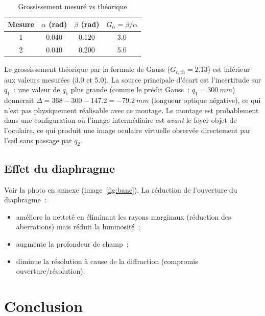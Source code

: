 ﻿\documentclass[a4paper, 11pt]{article}
\begin{document}
\begin{table}[H]
\centering
\caption{Grossissement mesuré vs théorique}
\begin{tabular}{cccc}
\toprule
Mesure & $\alpha$ (rad) & $\beta$ (rad) & $G_\alpha = \beta/\alpha$ \\
\midrule
1 & 0.040 & 0.120 & 3.0 \\
2 & 0.040 & 0.200 & 5.0 \\
\bottomrule
\end{tabular}
\end{table}

Le grossissement théorique par la formule de Gauss ($G_{c,\mathrm{th}} = 2.13$) est inférieur aux valeurs mesurées (3.0 et 5.0). La source principale d'écart est l'incertitude sur $q_1$~: une valeur de $q_1$ plus grande (comme le prédit Gauss~: $q_1 = \SI{300}{mm}$) donnerait $\Delta = 368 - 300 - 147.2 = \SI{-79.2}{mm}$ (longueur optique négative), ce qui n'est pas physiquement réalisable avec ce montage. Le montage est probablement dans une configuration où l'image intermédiaire est \emph{avant} le foyer objet de l'oculaire, ce qui produit une image oculaire virtuelle observée directement par l'œil sans passage par $q_2$.

\subsection{Effet du diaphragme}

Voir la photo en annexe (image~\ref{fig:banc}). La réduction de l'ouverture du diaphragme~:
\begin{itemize}
  \item améliore la netteté en éliminant les rayons marginaux (réduction des aberrations) mais réduit la luminosité~;
  \item augmente la profondeur de champ~;
  \item diminue la résolution à cause de la diffraction (compromis ouverture/résolution).
\end{itemize}

\section{Conclusion}
\end{document}
